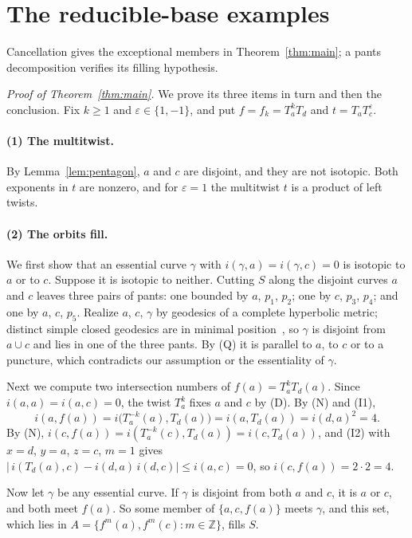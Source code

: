 \documentclass[11pt]{article}
\theoremstyle{remark}
\newcommand{\Z}{\mathbb{Z}}
\begin{document}
\section{The reducible-base examples}\label{sec:proof}

Cancellation gives the exceptional members in Theorem~\ref{thm:main};
a pants decomposition verifies its filling hypothesis.

\noindent\emph{Proof of Theorem~\ref{thm:main}.} We prove its three items in turn and then the conclusion. Fix
$k\ge1$ and $\varepsilon\in\{1,-1\}$, and put $f=f_k=T_a^kT_d$ and
$t=T_aT_c^{\varepsilon}$.

\paragraph{(1) The multitwist.} By Lemma~\ref{lem:pentagon}, $a$ and $c$ are
disjoint, and they are not isotopic. Both exponents in $t$ are nonzero, and
for $\varepsilon=1$ the multitwist $t$ is a product of left twists.

\paragraph{(2) The orbits fill.} We first show that an essential curve
$\gamma$ with $i(\gamma,a)=i(\gamma,c)=0$ is isotopic to $a$ or to $c$.
Suppose it is isotopic to neither. Cutting $S$ along the disjoint curves $a$
and $c$ leaves three pairs of pants: one bounded by $a$, $p_1$, $p_2$; one by
$c$, $p_3$, $p_4$; and one by $a$, $c$, $p_5$. Realize $a$, $c$, $\gamma$ by
geodesics of a complete hyperbolic metric; distinct simple closed geodesics
are in minimal position~\cite[\S1.2]{FM}, so $\gamma$ is disjoint from
$a\cup c$ and lies in one of the three pants. By (Q) it is parallel to $a$,
to $c$ or to a puncture, which contradicts our assumption or the
essentiality of $\gamma$.

Next we compute two intersection numbers of $f(a)=T_a^kT_d(a)$. Since
$i(a,a)=i(a,c)=0$, the twist $T_a^k$ fixes $a$ and $c$ by (D). By (N) and
(I1),
\[
i(a,f(a))=i\bigl(T_a^{-k}(a),T_d(a)\bigr)=i(a,T_d(a))=i(d,a)^2=4 .
\]
By (N), $i(c,f(a))=i(T_a^{-k}(c),T_d(a))=i(c,T_d(a))$, and (I2) with
$x=d$, $y=a$, $z=c$, $m=1$ gives
$\bigl|\,i(T_d(a),c)-i(d,a)\,i(d,c)\bigr|\le i(a,c)=0$, so
$i(c,f(a))=2\cdot2=4$.

Now let $\gamma$ be any essential curve. If $\gamma$ is disjoint from both
$a$ and $c$, it is $a$ or $c$, and both meet $f(a)$. So some member of
$\{a,c,f(a)\}$ meets $\gamma$, and this set, which lies in
$A=\{f^m(a),f^m(c):m\in\Z\}$, fills $S$.
\end{document}
